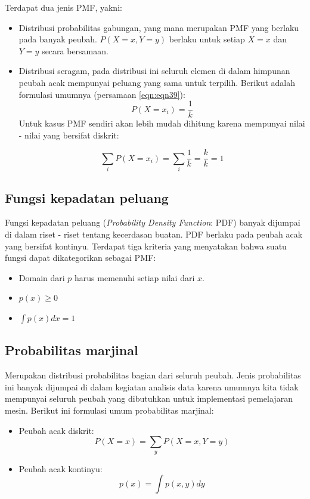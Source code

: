 Terdapat dua jenis PMF, yakni:
\begin{itemize}
	\item Distribusi probabilitas gabungan, yang mana merupakan PMF yang berlaku pada banyak peubah. $P(X=x, Y=y)$ berlaku untuk setiap $X=x$ dan $Y=y$ secara bersamaan.
	\item  Distribusi seragam, pada distribusi ini seluruh elemen di dalam himpunan peubah acak mempunyai peluang yang sama untuk terpilih. Berikut adalah formulasi umumnya (persamaan \ref{eqn:eqn39}):
	\begin{equation}\label{eqn:eqn39}
	P(X=x_{i}) = \frac{1}{k}
	\end{equation}
Untuk kasus PMF sendiri akan lebih mudah dihitung karena mempunyai nilai - nilai yang bersifat diskrit:

\begin{equation*}
\sum_{i}P(X=x_{i}) = \sum_{i}\frac{1}{k} = \frac{k}{k} = 1
\end{equation*}
\end{itemize}

\subsection{Fungsi kepadatan peluang}
Fungsi kepadatan peluang (\textit{Probability Density Function}: PDF) banyak dijumpai di dalam riset - riset tentang kecerdasan buatan. PDF berlaku pada peubah acak yang bersifat kontinyu.
Terdapat tiga kriteria yang menyatakan bahwa suatu fungsi dapat dikategorikan sebagai PMF:

\begin{itemize}
\item Domain dari $p$ harus memenuhi setiap nilai dari $x$.
\item $p(x) \geq 0$
\item $\int p(x) dx = 1$
\end{itemize}

\subsection{Probabilitas marjinal}
Merupakan distribusi probabilitas bagian dari seluruh peubah. Jenis probabilitas ini banyak dijumpai di dalam kegiatan analisis data karena umumnya kita tidak mempunyai seluruh peubah yang dibutuhkan untuk implementasi pemelajaran mesin. Berikut ini formulasi umum probabilitas marjinal:
\begin{itemize}
    \item Peubah acak diskrit:
    \begin{equation}
        P(X=x) = \sum_{y} P(X=x, Y=y)
        \label{eqn:eqn40}
    \end{equation}
    \item Peubah acak kontinyu:
    \begin{equation}
        p(x) = \int p(x,y) dy
        \label{eqn:eqn41}
    \end{equation}
\end{itemize}
